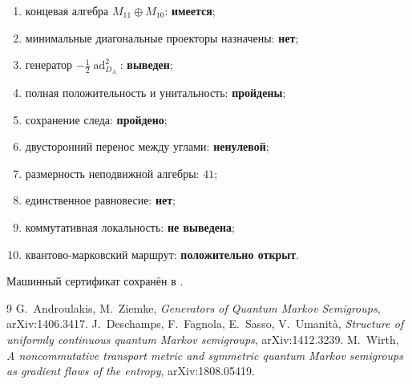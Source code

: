 \begin{protocol}
\begin{enumerate}
 \item концевая алгебра $M_{11}\oplus M_{10}$: \textbf{имеется};
 \item минимальные диагональные проекторы назначены: \textbf{нет};
 \item генератор $-\frac12\operatorname{ad}_{D_A}^2$: \textbf{выведен};
 \item полная положительность и унитальность: \textbf{пройдены};
 \item сохранение следа: \textbf{пройдено};
 \item двусторонний перенос между углами: \textbf{ненулевой};
 \item размерность неподвижной алгебры: \textbf{$41$};
 \item единственное равновесие: \textbf{нет};
 \item коммутативная локальность: \textbf{не выведена};
 \item квантово-марковский маршрут: \textbf{положительно открыт}.
\end{enumerate}
\end{protocol}

Машинный сертификат сохранён в
.

\begin{thebibliography}{9}
G.~Androulakis, M.~Ziemke,
\emph{Generators of Quantum Markov Semigroups}, arXiv:1406.3417.
J.~Deschamps, F.~Fagnola, E.~Sasso, V.~Umanit\`a,
\emph{Structure of uniformly continuous quantum Markov semigroups},
arXiv:1412.3239.
M.~Wirth,
\emph{A noncommutative transport metric and symmetric quantum Markov
semigroups as gradient flows of the entropy}, arXiv:1808.05419.
\end{thebibliography}